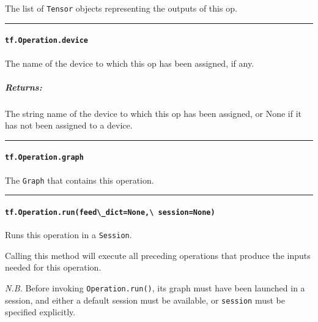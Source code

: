 The list of \lstinline{Tensor} objects representing the outputs of this op.

\begin{center}\rule{0.5\linewidth}{\linethickness}\end{center}

\paragraph{\texorpdfstring{\lstinline{tf.Operation.device}
}{tf.Operation.device }}\label{tf.operation.device}

The name of the device to which this op has been assigned, if any.

\subparagraph{Returns: }\label{returns-15}

The string name of the device to which this op has been assigned, or
None if it has not been assigned to a device.

\begin{center}\rule{0.5\linewidth}{\linethickness}\end{center}

\paragraph{\texorpdfstring{\lstinline{tf.Operation.graph}
}{tf.Operation.graph }}\label{tf.operation.graph}

The \lstinline{Graph} that contains this operation.

\begin{center}\rule{0.5\linewidth}{\linethickness}\end{center}

\paragraph{\texorpdfstring{\lstinline{tf.Operation.run(feed\_dict=None,\ session=None)}
}{tf.Operation.run(feed\_dict=None, session=None) }}\label{tf.operation.runfeedux5fdictnone-sessionnone}

Runs this operation in a \lstinline{Session}.

Calling this method will execute all preceding operations that produce
the inputs needed for this operation.

\emph{N.B.} Before invoking \lstinline{Operation.run()}, its graph must
have been launched in a session, and either a default session must be
available, or \lstinline{session} must be specified explicitly.

